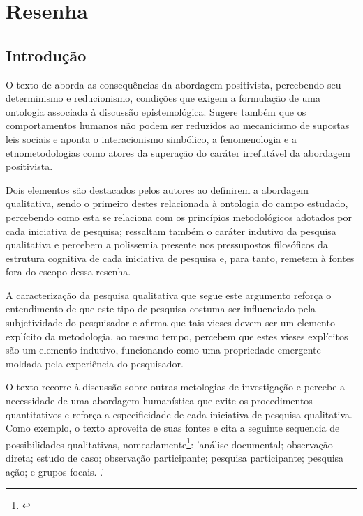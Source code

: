 \documentclass[
   article,       %
   12pt,          %
   oneside,       %
   a4paper,       %
   english,       %
   brazil,           %
   sumario=tradicional
   ]{abntex2}
\begin{document}

\frenchspacing 


\maketitle


\newpage

\textual
\section{Resenha}

\subsection{Introdução}

O texto de \cite[cap.6]{cap_6_ontologia} aborda as consequências da abordagem positivista, percebendo seu determinismo e reducionismo, condições que exigem a formulação de uma ontologia associada à discussão epistemológica. Sugere também que os comportamentos humanos não podem ser reduzidos ao mecanicismo de supostas leis sociais e aponta o interacionismo simbólico, a fenomenologia e a etnometodologias como atores da superação do caráter irrefutável da abordagem positivista.

Dois elementos são destacados pelos autores ao definirem a abordagem qualitativa, sendo o primeiro destes relacionada à ontologia do campo estudado, percebendo como esta se relaciona com os princípios metodológicos adotados por cada iniciativa de pesquisa; ressaltam também o caráter indutivo da pesquisa qualitativa e percebem a polissemia presente nos pressupostos filosóficos da estrutura cognitiva de cada iniciativa de pesquisa e, para tanto, remetem à fontes fora do escopo dessa resenha.

A caracterização da pesquisa qualitativa que segue este argumento reforça o entendimento de que este tipo de pesquisa costuma ser influenciado pela subjetividade do pesquisador e afirma que tais vieses devem ser um elemento explícito da metodologia, ao mesmo tempo, percebem que estes vieses explícitos são um elemento indutivo, funcionando como uma propriedade emergente moldada pela experiência do pesquisador.

O texto recorre à discussão sobre outras metologias de investigação e percebe a necessidade de uma abordagem humanística que evite os procedimentos quantitativos e reforça a especificidade de cada iniciativa de pesquisa qualitativa. Como exemplo, o texto aproveita de suas fontes e cita a seguinte sequencia de possibilidades qualitativas, nomeadamente\footnote{\cite[p.172]{cap_6_ontologia}}: 'análise documental; observação direta; estudo de caso; observação participante; pesquisa participante; pesquisa ação; e grupos focais. \cite[p.172]{cap_6_ontologia}.'
\end{document}

